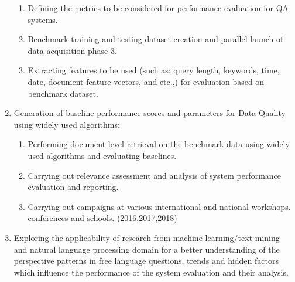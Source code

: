 \documentclass{article}
\begin{document}
\begin{enumerate}
\begin{enumerate}
\item Defining the metrics to be considered for performance evaluation for QA systems.

\item Benchmark training and testing dataset creation and parallel launch of data acquisition phase-3.

\item Extracting features to be used (such as: query length, keywords, time, date, document feature vectors, and etc.,) for evaluation based on benchmark dataset.

\end{enumerate}
 
\item Generation of baseline performance scores and parameters for Data Quality using widely used algorithms:

\begin{enumerate}
\item Performing document level retrieval on the benchmark data using widely used algorithms and evaluating baselines.
\item Carrying out relevance assessment and analysis of system performance evaluation and reporting.
\item Carrying out campaigns at various international and national workshops. conferences and schools. (2016,2017,2018)
\end{enumerate}
\item Exploring the applicability of research from machine learning/text mining and natural language processing domain for a better understanding of the perspective patterns in free language questions, trends and hidden factors which influence the performance of the system evaluation and their analysis. 
\end{enumerate}



\end{document}
